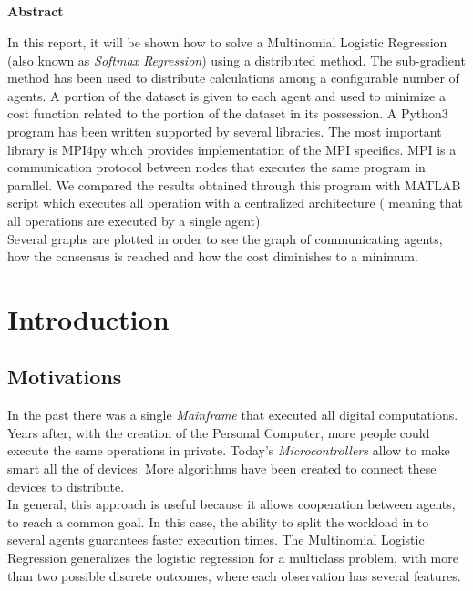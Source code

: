 \documentclass[a4paper,11pt,oneside]{book}
\begin{document}
\pagestyle{myheadings}



\newpage
\thispagestyle{empty}

\begin{center}
\chapter*{}
\thispagestyle{empty}
{\Huge \textbf{Abstract}}\\
\vspace{15mm}
\end{center}
In this report, it will be shown how to solve a Multinomial Logistic Regression (also known as \textit{Softmax Regression}) using a distributed method. The sub-gradient method has been used to distribute calculations among a configurable number of agents. A portion of the dataset is given to each agent and used to minimize a cost function related to the portion of the dataset in its possession.
A Python3 program has been written supported by several libraries. The most important library is MPI4py which provides implementation of the MPI specifics. MPI is a communication protocol between nodes that executes the same program in parallel. We compared the results obtained through this program with MATLAB script which executes all operation with  a centralized architecture ( meaning that all operations are executed by a single agent).\\
Several graphs are plotted in order to see the graph of communicating agents, how the consensus is reached and how the cost diminishes to a minimum.


\tableofcontents \thispagestyle{empty}
\listoffigures\thispagestyle{empty}

\chapter*{Introduction}

\section*{Motivations}
In the past there was a single \textit{Mainframe} that executed all digital computations. Years after, with the creation of the Personal Computer, more people could execute the same operations in private. Today's \textit{Microcontrollers} allow to make smart all the of devices. More algorithms have been created to connect these devices to distribute.\\
 In general, this approach is useful because it allows cooperation between agents, to reach a common goal. In this case, the ability to split the workload in to several agents guarantees faster execution times.
The Multinomial Logistic Regression generalizes the logistic regression for a multiclass problem, with more than two possible discrete outcomes, where each observation has several features.
\end{document}
